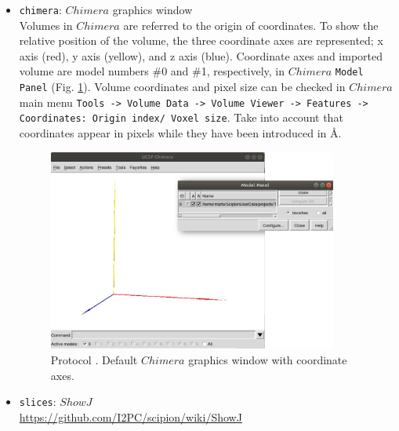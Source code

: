 \documentclass[12pt]{article} %
\newcommand{\ffigure}[1]{{Fig. {\ref{#1}}}\xspace}
\newcommand{\scommand}[1]{{{\keys{#1}}}\xspace}
\newcommand{\ttt}[1]{\texttt{#1}}
\begin{document}
\begin{appendices}
\begin{itemize}
   \begin{itemize}
   \item \ttt{chimera}: $Chimera$ graphics window\\
   
   Volumes in $Chimera$ are referred to the origin of coordinates. To show the relative position of the volume, the three coordinate axes are represented; x axis (red), y axis (yellow), and z axis (blue). Coordinate axes and imported volume are model numbers \#0 and \#1, respectively, in $Chimera$ \ttt{Model Panel} (\ffigure{fig:app_protocol_volume_3}). Volume coordinates and pixel size can be checked in $Chimera$ main menu \ttt{Tools -> Volume Data -> Volume Viewer -> Features -> Coordinates: Origin index/ Voxel size}. Take into account that coordinates appear in pixels while they have been introduced in \AA.
   
   \begin{figure}[H]
   \centering 
    \captionsetup{width=.7\linewidth} 
    \includegraphics[width=0.90\textwidth]{Images_appendix/Fig102.png}
    \caption{Protocol \scommand{import volumes}. Default $Chimera$ graphics window with coordinate axes.}
    \label{fig:app_protocol_volume_3}
    \end{figure}
   
  \item \ttt{slices}: $ShowJ$\\
   
\url{https://github.com/I2PC/scipion/wiki/ShowJ}



\end{itemize}
\end{itemize}
\end{appendices}
\end{document}
